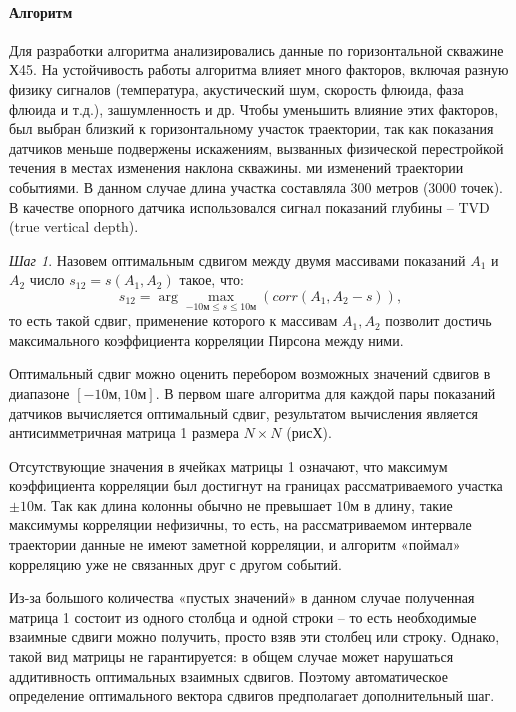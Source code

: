 \paragraph{Алгоритм}
\par
Для разработки алгоритма анализировались данные по горизонтальной скважине Х45. На устойчивость работы алгоритма влияет много факторов, включая разную физику сигналов (температура, акустический шум, скорость флюида, фаза флюида и т.д.), зашумленность и др. Чтобы уменьшить влияние этих факторов, был выбран близкий к горизонтальному участок траектории, так как показания датчиков меньше подвержены искажениям, вызванных физической перестройкой течения в местах изменения наклона скважины. ми изменений траектории событиями. В данном случае длина участка составляла 300 метров (3000 точек). В качестве опорного датчика использовался сигнал показаний глубины – TVD (true vertical depth). 
\par
\textit{Шаг 1}. Назовем оптимальным сдвигом между двумя массивами показаний $A_1$ и $A_2$ число $s_{12}= s(A_1,A_2)$ такое, что:
\begin{equation}
    s_{12}=\arg\max_{-10\text{м}\leq s\leq10\text{м}} \left(corr(A_1,A_2-s)\right),
\end{equation}
то есть такой сдвиг, применение которого к массивам $A_1,A_2$ позволит достичь максимального коэффициента корреляции Пирсона между ними.
\par
Оптимальный сдвиг можно оценить перебором возможных значений сдвигов в диапазоне $[-10\text{м},10\text{м}]$. В первом шаге алгоритма для каждой пары показаний датчиков вычисляется оптимальный сдвиг, результатом вычисления является антисимметричная матрица 1 размера $N\times N$ (рисХ). 
\par
Отсутствующие значения в ячейках матрицы 1 означают, что максимум коэффициента корреляции был достигнут на границах рассматриваемого участка $\pm10\text{м}$. Так как длина колонны обычно не превышает $10$м в длину, такие максимумы корреляции нефизичны, то есть, на рассматриваемом интервале траектории данные не имеют заметной корреляции, и алгоритм «поймал» корреляцию уже не связанных друг с другом событий.
\par
Из-за большого количества «пустых значений» в данном случае полученная матрица 1 состоит из одного столбца и одной строки – то есть необходимые взаимные сдвиги можно получить, просто взяв эти столбец или строку. Однако, такой вид матрицы не гарантируется: в общем случае может нарушаться аддитивность оптимальных взаимных сдвигов. Поэтому автоматическое определение оптимального вектора сдвигов предполагает дополнительный шаг.
